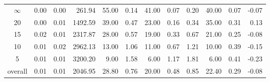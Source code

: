 \begin{table}[H]
\begin{tabular}{c rrrr rr rrr rr}
\cmidrule(lr){1-1} \cmidrule(lr){2-5} \cmidrule(lr){2-5} \cmidrule(lr){6-7} \cmidrule(lr){8-10} \cmidrule(lr){11-12}
$\infty$ & 0.00 & 0.00 & 261.94 & 55.00 & 0.14 & 41.00 & 0.07 & 0.20 & 40.00 & 0.07 & -0.07 \\
20 & 0.00 & 0.01 & 1492.59 & 39.00 & 0.47 & 23.00 & 0.16 & 0.34 & 35.00 & 0.31 & 0.13 \\
15 & 0.02 & 0.01 & 2317.87 & 28.00 & 0.57 & 19.00 & 0.33 & 0.67 & 21.00 & 0.25 & -0.08 \\
10 & 0.01 & 0.02 & 2962.13 & 13.00 & 1.06 & 11.00 & 0.67 & 1.21 & 10.00 & 0.39 & -0.15 \\
5 & 0.01 & 0.01 & 3200.20 & 9.00 & 1.58 & 6.00 & 1.17 & 1.81 & 6.00 & 0.41 & -0.23 \\
\midrule
overall & 0.01 & 0.01 & 2046.95 & 28.80 & 0.76 & 20.00 & 0.48 & 0.85 & 22.40 & 0.29 & -0.08 \\
\bottomrule
\end{tabular}
\end{table}